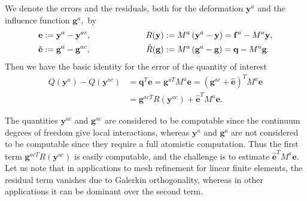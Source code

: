 \documentclass[11pt,reqno,oneside]{amsart}
\numberwithin{equation}{section}
\begin{document}
We denote the errors and the residuals, both for the deformation ${\mathbf{y}}^a$
and the influence function ${\mathbf{g}}^a,$ by
\begin{equation} \label{EqErrorPrimalDual}
\begin{aligned}
  {\mathbf{e}}          & := {\mathbf{y}}^a - {\mathbf{y}}^{ac}, & \hspace{20mm}
  R({\mathbf{y}})       & := M^a \left( {\mathbf{y}}^a - {\mathbf{y}} \right)
                     = {\mathbf{f}}^a - M^a {\mathbf{y}}, \\
  \hat{{\mathbf{e}}}    & := {\mathbf{g}}^a - {\mathbf{g}}^{ac}, &
  \hat{R}({\mathbf{g}}) & := M^a \left( {\mathbf{g}}^a - {\mathbf{g}} \right)
                     = {\mathbf{q}} - M^a {\mathbf{g}}.
\end{aligned}
\end{equation}
Then we have the basic identity for the error of the quantity of
interest
\begin{equation}\label{EqBasicDual}
\begin{split}
  Q({\mathbf{y}}^a) - Q({\mathbf{y}}^{ac})
  & = {\mathbf{q}}^T {\mathbf{e}} = {\mathbf{g}}^{aT} M^a {\mathbf{e}}
    = ({\mathbf{g}}^{ac} + \hat{{\mathbf{e}}})^T M^a {\mathbf{e}} \\
  & = {\mathbf{g}}^{acT} R({\mathbf{y}}^{ac}) + \hat{{\mathbf{e}}}^T M^a {\mathbf{e}}.
\end{split}
\end{equation}

The quantities ${\mathbf{y}}^{ac}$ and ${\mathbf{g}}^{ac}$ are considered to be computable since
the continuum degrees of freedom give local interactions, whereas ${\mathbf{y}}^a$
and ${\mathbf{g}}^a$ are not considered to be computable since they require
a full atomistic computation.  Thus the first term ${\mathbf{g}}^{acT} R({\mathbf{y}}^{ac})$ is
easily computable, and the challenge is to estimate $\hat{{\mathbf{e}}}^T M^a {\mathbf{e}}$.
Let us note that in applications to mesh refinement for linear finite elements,
the residual term vanishes due to Galerkin orthogonality, whereas in other
applications it can be dominant over the second term.
\end{document}
